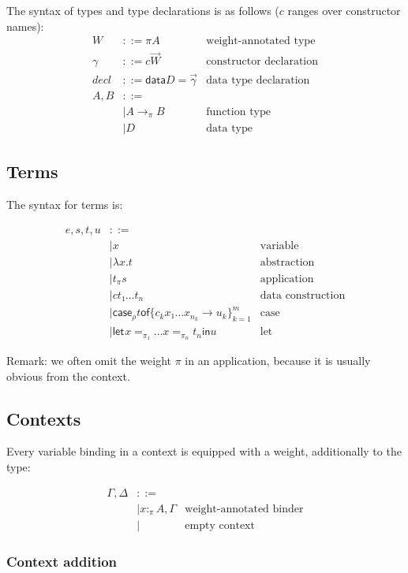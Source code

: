 \documentclass[11pt]{article}
\newcommand{\case}[3][]{\mathsf{case}_{#1} #2 \mathsf{of} \{#3\}^m_{k=1}}
\newcommand{\flet}[1][]{\mathsf{let}_{#1} }
\newcommand{\fin}{ \mathsf{in} }
\begin{document}
The syntax of types and type declarations is as follows ($c$ ranges over constructor names):
\begin{align*}
  W &::= πA &\text{weight-annotated type}\\
  γ &::= c  \vec{W}&\text{constructor declaration}\\
  decl &::= \mathsf{data } D = \vec{γ}&\text{data type declaration}\\
  A,B &::=\\
      & |  A →_π B &\text{function type}\\
      & |  D &\text{data type}
\end{align*}

\subsection{Terms}
\label{sec:orgheadline3}

The syntax for terms is:

\begin{align*}
e,s,t,u & ::= \\
    & |  x & \text{variable} \\
    & |  λx. t & \text{abstraction} \\
    & |  t_π s & \text{application} \\
    & |  c t₁ … t_n & \text{data construction} \\
    & |  \case[ρ] t {c_k  x₁ … x_{n_k} → u_k}  & \text{case} \\
    & |  \flet x =_{π₁} … x =_{π_n} t_n \fin u & \text{let}
\end{align*}

Remark: we often omit the weight $π$ in an application, because it is
usually obvious from the context.

\subsection{Contexts}
\label{sec:orgheadline6}

Every variable binding in a context is equipped with a weight,
additionally to the type:

\begin{align*}
  Γ,Δ & ::=\\
    & |  x :_π A, Γ & \text{weight-annotated binder} \\
    & |     & \text {empty context}
\end{align*}

\subsubsection{Context addition}
\label{sec:orgheadline4}
\end{document}
